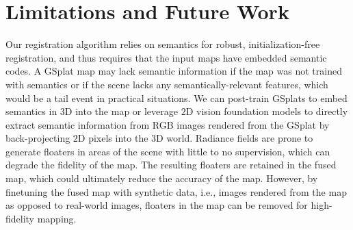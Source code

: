 \section{Limitations and Future Work}
\label{sec:limitations_future_work}
Our registration algorithm relies on semantics for robust, initialization-free registration, and thus requires that the input maps have embedded semantic codes. A GSplat map may lack semantic information if the map was not trained with semantics or if the scene lacks any semantically-relevant features, which would be a tail event in practical situations. We can post-train GSplats to embed semantics in $3$D into the map or leverage $2$D vision foundation models to directly extract semantic information from RGB images rendered from the GSplat by back-projecting $2$D pixels into the $3$D world.
Radiance fields are prone to generate floaters in areas of the scene with little to no supervision, which can degrade the fidelity of the map. The resulting floaters are retained in the fused map, which could ultimately reduce the accuracy of the map. However, by finetuning the fused map with synthetic data, i.e., images rendered from the map as opposed to real-world images, floaters in the map can be removed for high-fidelity mapping.
